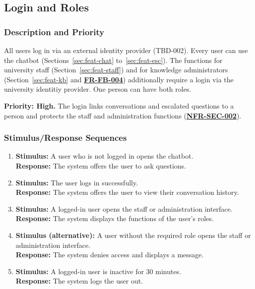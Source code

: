 \documentclass[11pt, a4paper]{article}
\newcommand{\reqref}[1]{\hyperref[req:#1]{\textbf{#1}}}
\begin{document}
\subsection{Login and Roles}
\label{sec:feat-auth}
\subsubsection{Description and Priority}
All users log in via an external identity provider (TBD-002). Every user can use the chatbot (Sections~\ref{sec:feat-chat} to~\ref{sec:feat-esc}). The functions for university staff (Section~\ref{sec:feat-staff}) and for knowledge administrators (Section~\ref{sec:feat-kb} and \reqref{FR-FB-004}) additionally require a login via the university identitiy provider. One person can have both roles.

\textbf{Priority: High.} The login links conversations and escalated questions to a person and protects the staff and administration functions (\reqref{NFR-SEC-002}).

\subsubsection{Stimulus/Response Sequences}
\begin{enumerate}
    \item \textbf{Stimulus:} A user who is not logged in opens the chatbot.\\
          \textbf{Response:} The system offers the user to ask questions.
    \item \textbf{Stimulus:} The user logs in successfully.\\
          \textbf{Response:} The system offers the user to view their conversation history.
    \item \textbf{Stimulus:} A logged-in user opens the staff or administration interface.\\
          \textbf{Response:} The system displays the functions of the user's roles.
    \item \textbf{Stimulus (alternative):} A user without the required role opens the staff or administration interface.\\
          \textbf{Response:} The system denies access and displays a message.
    \item \textbf{Stimulus:} A logged-in user is inactive for 30 minutes.\\
          \textbf{Response:} The system logs the user out.
\end{enumerate}
\end{document}

